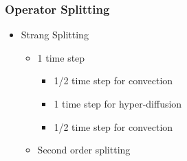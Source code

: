 \documentclass[10pt]{beamer}
\begin{document}
    \begin{frame}
      \frametitle{Operator Splitting}
      \begin{itemize}
        \item Strang Splitting
          \begin{itemize}
            \item 1 time step
              \begin{itemize}
                \item 1/2 time step for convection
                \item 1 time step for hyper-diffusion
                \item 1/2 time step for convection
              \end{itemize}
            \item Second order splitting
          \end{itemize}
      \end{itemize}
    \end{frame}
\end{document}
